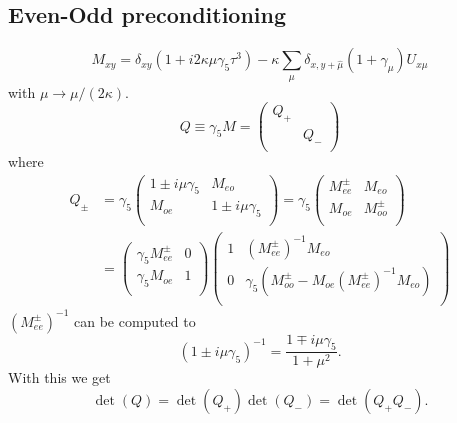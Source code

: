 \subsection{Even-Odd preconditioning}

\begin{equation}
  \label{eq:eo0}
  M_{xy} =\delta_{xy}(1+i2\kappa\mu\gamma_5\tau^3) - \kappa\sum_\mu \delta_{x,y+\hat\mu}(1+\gamma_\mu) U_{x\mu}
\end{equation}
with $\mu \to \mu/(2\kappa)$.
\begin{equation}
  \label{eq:eo1}
  Q\equiv \gamma_5 M = \begin{pmatrix}
      Q_+ & \\\
         & Q_- \\
      \end{pmatrix}
\end{equation}
where
\begin{equation}
  \label{eq:eo2}
  \begin{split}
    Q_\pm &= \gamma_5\begin{pmatrix}
      1\pm i\mu\gamma_5 & M_{eo} \\
      M_{oe}    & 1\pm i\mu\gamma_5 \\
    \end{pmatrix} =
    \gamma_5\begin{pmatrix}
      M_{ee}^\pm & M_{eo} \\
      M_{oe}    & M_{oo}^\pm \\
    \end{pmatrix} \\
    & =
    \begin{pmatrix}
      \gamma_5M_{ee}^\pm & 0 \\
      \gamma_5M_{oe}  & 1 \\
    \end{pmatrix}
    \begin{pmatrix}
      1       & (M_{ee}^\pm)^{-1}M_{eo}\\
      0       & \gamma_5(M_{oo}^\pm-M_{oe}(M_{ee}^\pm)^{-1}M_{eo})\\
    \end{pmatrix}
\end{split}
\end{equation}
$(M_{ee}^\pm)^{-1}$ can be computed to 
\[
(1\pm i\mu\gamma_5)^{-1} = \frac{1\mp i\mu\gamma_5}{1+\mu^2}.
\]
With this we get
\begin{equation}
  \label{eq:eo3}
  \det(Q)=\det(Q_+)\det(Q_-) = \det(Q_+ Q_-).
\end{equation}

